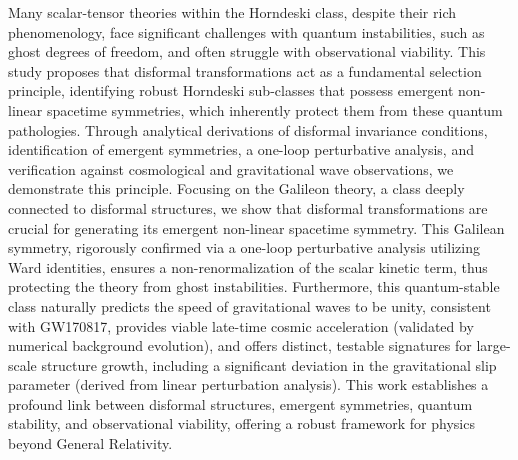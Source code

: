 \documentclass[twocolumn]{aastex631}
\begin{document}
Many scalar-tensor theories within the Horndeski class, despite their rich phenomenology, face significant challenges with quantum instabilities, such as ghost degrees of freedom, and often struggle with observational viability. This study proposes that disformal transformations act as a fundamental selection principle, identifying robust Horndeski sub-classes that possess emergent non-linear spacetime symmetries, which inherently protect them from these quantum pathologies. Through analytical derivations of disformal invariance conditions, identification of emergent symmetries, a one-loop perturbative analysis, and verification against cosmological and gravitational wave observations, we demonstrate this principle. Focusing on the Galileon theory, a class deeply connected to disformal structures, we show that disformal transformations are crucial for generating its emergent non-linear spacetime symmetry. This Galilean symmetry, rigorously confirmed via a one-loop perturbative analysis utilizing Ward identities, ensures a non-renormalization of the scalar kinetic term, thus protecting the theory from ghost instabilities. Furthermore, this quantum-stable class naturally predicts the speed of gravitational waves to be unity, consistent with GW170817, provides viable late-time cosmic acceleration (validated by numerical background evolution), and offers distinct, testable signatures for large-scale structure growth, including a significant deviation in the gravitational slip parameter (derived from linear perturbation analysis). This work establishes a profound link between disformal structures, emergent symmetries, quantum stability, and observational viability, offering a robust framework for physics beyond General Relativity.
\end{document}
